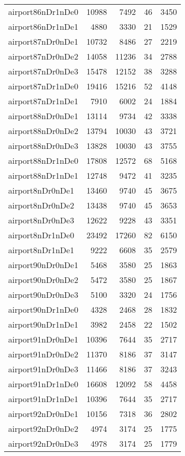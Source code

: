 \begin{tabular}{lrrrr}
airport86nDr1nDe0 & 10988 & 7492 & 46 & 3450 \\
airport86nDr1nDe1 & 4880 & 3330 & 21 & 1529 \\
airport87nDr0nDe1 & 10732 & 8486 & 27 & 2219 \\
airport87nDr0nDe2 & 14058 & 11236 & 34 & 2788 \\
airport87nDr0nDe3 & 15478 & 12152 & 38 & 3288 \\
airport87nDr1nDe0 & 19416 & 15216 & 52 & 4148 \\
airport87nDr1nDe1 & 7910 & 6002 & 24 & 1884 \\
airport88nDr0nDe1 & 13114 & 9734 & 42 & 3338 \\
airport88nDr0nDe2 & 13794 & 10030 & 43 & 3721 \\
airport88nDr0nDe3 & 13828 & 10030 & 43 & 3755 \\
airport88nDr1nDe0 & 17808 & 12572 & 68 & 5168 \\
airport88nDr1nDe1 & 12748 & 9472 & 41 & 3235 \\
airport8nDr0nDe1 & 13460 & 9740 & 45 & 3675 \\
airport8nDr0nDe2 & 13438 & 9740 & 45 & 3653 \\
airport8nDr0nDe3 & 12622 & 9228 & 43 & 3351 \\
airport8nDr1nDe0 & 23492 & 17260 & 82 & 6150 \\
airport8nDr1nDe1 & 9222 & 6608 & 35 & 2579 \\
airport90nDr0nDe1 & 5468 & 3580 & 25 & 1863 \\
airport90nDr0nDe2 & 5472 & 3580 & 25 & 1867 \\
airport90nDr0nDe3 & 5100 & 3320 & 24 & 1756 \\
airport90nDr1nDe0 & 4328 & 2468 & 28 & 1832 \\
airport90nDr1nDe1 & 3982 & 2458 & 22 & 1502 \\
airport91nDr0nDe1 & 10396 & 7644 & 35 & 2717 \\
airport91nDr0nDe2 & 11370 & 8186 & 37 & 3147 \\
airport91nDr0nDe3 & 11466 & 8186 & 37 & 3243 \\
airport91nDr1nDe0 & 16608 & 12092 & 58 & 4458 \\
airport91nDr1nDe1 & 10396 & 7644 & 35 & 2717 \\
airport92nDr0nDe1 & 10156 & 7318 & 36 & 2802 \\
airport92nDr0nDe2 & 4974 & 3174 & 25 & 1775 \\
airport92nDr0nDe3 & 4978 & 3174 & 25 & 1779 \\

\end{tabular}
